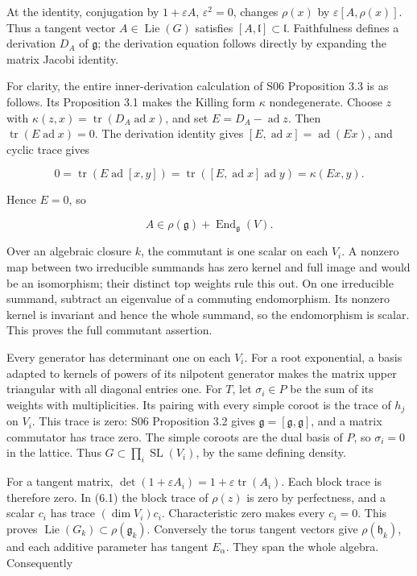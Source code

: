 \documentclass[11pt,a4paper,openany]{report}
\begin{document}
At the identity, conjugation by \(1+\varepsilon A\), \(\varepsilon^2=0\), changes \(\rho(x)\) by \(\varepsilon[A,\rho(x)]\). Thus a tangent vector \(A\in\operatorname{Lie}(G)\) satisfies \([A,\mathfrak l]\subset\mathfrak l\). Faithfulness defines a derivation \(D_A\) of \(\mathfrak g\); the derivation equation follows directly by expanding the matrix Jacobi identity.

For clarity, the entire inner-derivation calculation of S06 Proposition 3.3 is as follows. Its Proposition 3.1 makes the Killing form \(\kappa\) nondegenerate. Choose \(z\) with \(\kappa(z,x)=\operatorname{tr}(D_A\operatorname{ad}x)\), and set \(E=D_A-\operatorname{ad}z\). Then \(\operatorname{tr}(E\operatorname{ad}x)=0\). The derivation identity gives \([E,\operatorname{ad}x]=\operatorname{ad}(Ex)\), and cyclic trace gives

\[
0=\operatorname{tr}(E\operatorname{ad}[x,y])
=\operatorname{tr}([E,\operatorname{ad}x]\operatorname{ad}y)
=\kappa(Ex,y).
\]

Hence \(E=0\), so

\[
A\in\rho(\mathfrak g)+\operatorname{End}_{\mathfrak g}(V).
\tag{6.1}
\]

Over an algebraic closure \(k\), the commutant is one scalar on each \(V_i\). A nonzero map between two irreducible summands has zero kernel and full image and would be an isomorphism; their distinct top weights rule this out. On one irreducible summand, subtract an eigenvalue of a commuting endomorphism. Its nonzero kernel is invariant and hence the whole summand, so the endomorphism is scalar. This proves the full commutant assertion.

Every generator has determinant one on each \(V_i\). For a root exponential, a basis adapted to kernels of powers of its nilpotent generator makes the matrix upper triangular with all diagonal entries one. For \(T\), let \(\sigma_i\in P\) be the sum of its weights with multiplicities. Its pairing with every simple coroot is the trace of \(h_j\) on \(V_i\). This trace is zero: S06 Proposition 3.2 gives \(\mathfrak g=[\mathfrak g,\mathfrak g]\), and a matrix commutator has trace zero. The simple coroots are the dual basis of \(P\), so \(\sigma_i=0\) in the lattice. Thus \(G\subset\prod_i\operatorname{SL}(V_i)\), by the same defining density.

For a tangent matrix, \(\det(1+\varepsilon A_i)=1+\varepsilon\operatorname{tr}(A_i)\). Each block trace is therefore zero. In (6.1) the block trace of \(\rho(z)\) is zero by perfectness, and a scalar \(c_i\) has trace \((\dim V_i)c_i\). Characteristic zero makes every \(c_i=0\). This proves \(\operatorname{Lie}(G_k)\subset\rho(\mathfrak g_k)\). Conversely the torus tangent vectors give \(\rho(\mathfrak h_k)\), and each additive parameter has tangent \(E_\alpha\). They span the whole algebra. Consequently
\end{document}
